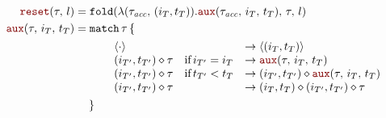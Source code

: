 \begin{align}
    \reset{\tau}{l}           & = \ttf{fold}(\lambda (\tau_\textit{acc}, \, (i_T, t_T)). \resetAux{\tau_\textit{acc}}{i_T}{t_T}, \, \tau, \, l)  \label{rule:semantics:grfrp:opsem:aux:reset} \\
    \resetAux{\tau}{i_T}{t_T} & =  \ttf{match} \, \tau \, \{ \label{rule:semantics:grfrp:opsem:aux:reset:aux}                                                                                 \\
                              & \quad \qquad \begin{array}{lll}
                                                 \emptytimer                    &                           & \rightarrow \queue{(i_T, t_T)}                                  \\
                                                 (i_{T'}, t_{T'}) \diamond \tau & \text{if} \, i_{T'} = i_T & \rightarrow \resetAux{\tau}{i_T}{t_T}                           \\
                                                 (i_{T'}, t_{T'}) \diamond \tau & \text{if} \, t_{T'} < t_T & \rightarrow (i_{T'}, t_{T'}) \diamond \resetAux{\tau}{i_T}{t_T} \\
                                                 (i_{T'}, t_{T'}) \diamond \tau &                           & \rightarrow (i_T, t_T) \diamond (i_{T'}, t_{T'}) \diamond \tau  \\
                                             \end{array} \nonumber                     \\
                              & \; \quad \} \nonumber
\end{align}

